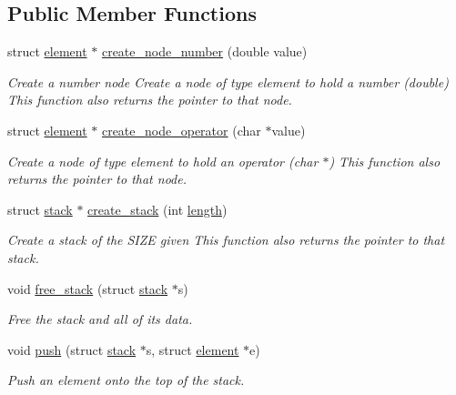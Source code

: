 \subsection*{Public Member Functions}
\begin{DoxyCompactItemize}
\item 
struct \hyperlink{structstack_1_1element}{element} $\ast$ \hyperlink{structstack_ab9ca4e2e8bb8a7dae2e1891d77bcf4c4}{create\-\_\-node\-\_\-number} (double value)
\begin{DoxyCompactList}\small\item\em Create a number node Create a node of type element to hold a number (double) This function also returns the pointer to that node. \end{DoxyCompactList}\item 
struct \hyperlink{structstack_1_1element}{element} $\ast$ \hyperlink{structstack_af2a10c10471e628cd129d6d851d2fc11}{create\-\_\-node\-\_\-operator} (char $\ast$value)
\begin{DoxyCompactList}\small\item\em Create a node of type element to hold an operator (char $\ast$) This function also returns the pointer to that node. \end{DoxyCompactList}\item 
struct \hyperlink{structstack}{stack} $\ast$ \hyperlink{structstack_a5ffff21dd2d1460c654edb7c8c54945b}{create\-\_\-stack} (int \hyperlink{structstack_a9f59b34b1f25fe00023291b678246bcc}{length})
\begin{DoxyCompactList}\small\item\em Create a stack of the S\-I\-Z\-E given This function also returns the pointer to that stack. \end{DoxyCompactList}\item 
void \hyperlink{structstack_ab5ead2093b4871d147ce22ede36de84f}{free\-\_\-stack} (struct \hyperlink{structstack}{stack} $\ast$s)
\begin{DoxyCompactList}\small\item\em Free the stack and all of its data. \end{DoxyCompactList}\item 
void \hyperlink{structstack_ac25c7501ee0d028a1a2a8ed08c737750}{push} (struct \hyperlink{structstack}{stack} $\ast$s, struct \hyperlink{structstack_1_1element}{element} $\ast$e)
\begin{DoxyCompactList}\small\item\em Push an element onto the top of the stack. \end{DoxyCompactList}\item 

\end{DoxyCompactItemize}
